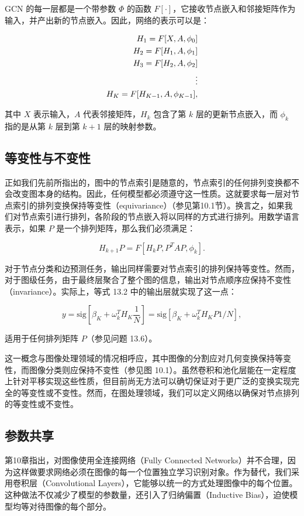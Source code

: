 \documentclass[lang=cn,newtx,10pt,scheme=chinese]{elegantbook}
\begin{document}
GCN 的每一层都是一个带参数 \(\Phi\) 的函数 \(F[\cdot]\)，它接收节点嵌入和邻接矩阵作为输入，并产出新的节点嵌入。因此，网络的表示可以是：


\begin{align}
H_1 = F[X, A, \phi_0] \notag \\
H_2 = F[H_1, A, \phi_1] \notag \\
H_3 = F[H_2, A, \phi_2] \notag \\
\vdots \notag \\
H_K = F[H_{K-1}, A, \phi_{K-1}], 
\end{align} 


其中 \(X\) 表示输入，\(A\) 代表邻接矩阵，\(H_k\) 包含了第 \(k\) 层的更新节点嵌入，而 \(\phi_k\) 指的是从第 \(k\) 层到第 \(k+1\) 层的映射参数。

\subsection{等变性与不变性}
正如我们先前所指出的，图中的节点索引是随意的，节点索引的任何排列变换都不会改变图本身的结构。因此，任何模型都必须遵守这一性质。这就要求每一层对节点索引的排列变换保持等变性（equivariance）（参见第10.1节）。换言之，如果我们对节点索引进行排列，各阶段的节点嵌入将以同样的方式进行排列。用数学语言表示，如果 \(P\) 是一个排列矩阵，那么我们必须满足：

\begin{equation}
H_{k+1}P = F[H_kP, P^TAP, \phi_k]. 
\end{equation}

对于节点分类和边预测任务，输出同样需要对节点索引的排列保持等变性。然而，对于图级任务，由于最终层聚合了整个图的信息，输出对节点顺序应保持不变性（invariance）。实际上，等式 13.2 中的输出层就实现了这一点：

\begin{equation}
y = \text{sig}[\beta_K + \omega_k^T H_K \frac{1}{N}] = \text{sig}[\beta_K + \omega_k^T H_KP1/N], 
\end{equation}

适用于任何排列矩阵 \(P\)（参见问题 13.6）。

这一概念与图像处理领域的情况相呼应，其中图像的分割应对几何变换保持等变性，而图像分类则应保持不变性（参见图 10.1）。虽然卷积和池化层能在一定程度上针对平移实现这些性质，但目前尚无方法可以确切保证对于更广泛的变换实现完全的等变性或不变性。然而，在图处理领域，我们可以定义网络以确保对节点排列的等变性或不变性。
\subsection{参数共享}
第10章指出，对图像使用全连接网络（Fully Connected Networks）并不合理，因为这样做要求网络必须在图像的每一个位置独立学习识别对象。作为替代，我们采用卷积层（Convolutional Layers），它能够以统一的方式处理图像中的每个位置。这种做法不仅减少了模型的参数量，还引入了归纳偏置（Inductive Bias），迫使模型均等对待图像的每个部分。
\end{document}
